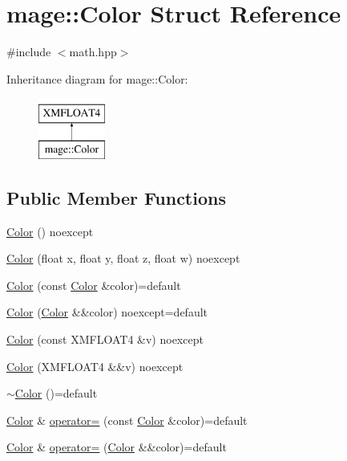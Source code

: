 \hypertarget{structmage_1_1_color}{}\section{mage\+:\+:Color Struct Reference}
\label{structmage_1_1_color}


{\ttfamily \#include $<$math.\+hpp$>$}

Inheritance diagram for mage\+:\+:Color\+:\begin{figure}[H]
\begin{center}
\leavevmode
\includegraphics[height=2.000000cm]{structmage_1_1_color}
\end{center}
\end{figure}
\subsection*{Public Member Functions}
\begin{DoxyCompactItemize}
\item 
\hyperlink{structmage_1_1_color_a542f26c61d9c67098302b0262c518758}{Color} () noexcept
\item 
\hyperlink{structmage_1_1_color_aa8376e2ad8a303751939eb447f6fa51b}{Color} (float x, float y, float z, float w) noexcept
\item 
\hyperlink{structmage_1_1_color_a725cc051131ad2796383e714fb0038d9}{Color} (const \hyperlink{structmage_1_1_color}{Color} \&color)=default
\item 
\hyperlink{structmage_1_1_color_ada141b94913980bf54a3ac4fb3d45f35}{Color} (\hyperlink{structmage_1_1_color}{Color} \&\&color) noexcept=default
\item 
\hyperlink{structmage_1_1_color_afb821e8ce617a6475538fa7179a16c6b}{Color} (const X\+M\+F\+L\+O\+A\+T4 \&v) noexcept
\item 
\hyperlink{structmage_1_1_color_a6e01540c01b2923974ca31e1621f1f7e}{Color} (X\+M\+F\+L\+O\+A\+T4 \&\&v) noexcept
\item 
\hyperlink{structmage_1_1_color_aa4df1c9718b7846adf77fbeed79ac219}{$\sim$\+Color} ()=default
\item 
\hyperlink{structmage_1_1_color}{Color} \& \hyperlink{structmage_1_1_color_a194847cf864911d7ceff16aabec1459f}{operator=} (const \hyperlink{structmage_1_1_color}{Color} \&color)=default
\item 
\hyperlink{structmage_1_1_color}{Color} \& \hyperlink{structmage_1_1_color_aa16160a9b8a03a8b2d82569343dd8c6d}{operator=} (\hyperlink{structmage_1_1_color}{Color} \&\&color)=default
\end{DoxyCompactItemize}


